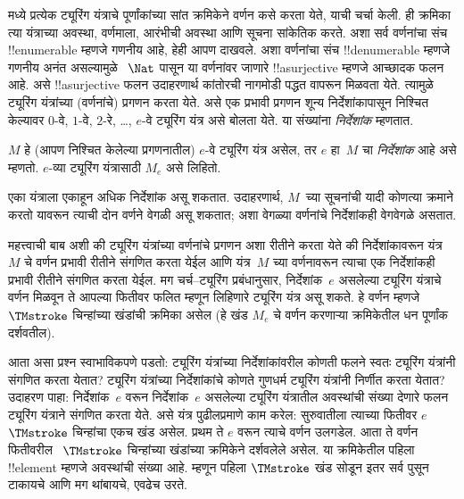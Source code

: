 \documentclass[../../../include/open-logic-section]{subfiles}
\begin{document}

 मध्ये प्रत्येक ट्यूरिंग यंत्राचे
पूर्णांकांच्या सांत क्रमिकेने वर्णन कसे करता येते,
याची चर्चा केली. ही क्रमिका त्या यंत्राच्या अवस्था,
वर्णमाला, आरंभीची अवस्था आणि सूचना सांकेतिक करते.
अशा सर्व वर्णनांचा संच !!{enumerable} म्हणजे गणनीय
आहे, हेही आपण दाखवले. अशा वर्णनांचा संच
!!{denumerable} म्हणजे गणनीय अनंत असल्यामुळे
~$\Nat$ पासून या वर्णनांवर जाणारे
!!a{surjective} म्हणजे आच्छादक फलन आहे.
असे !!a{surjective} फलन उदाहरणार्थ कांतोरची
नागमोडी पद्धत वापरून मिळवता येते. त्यामुळे
ट्यूरिंग यंत्रांच्या (वर्णनांचे) प्रगणन करता येते.
असे एक प्रभावी प्रगणन शून्य निर्देशांकापासून निश्चित केल्यावर $0$-वे, $1$-वे,
$2$-रे, \dots, $e$-वे ट्यूरिंग यंत्र असे
बोलता येते. या संख्यांना \emph{निर्देशांक} म्हणतात.

\begin{defn}
$M$ हे (आपण निश्चित केलेल्या प्रगणनातील)
$e$-वे ट्यूरिंग यंत्र असेल, तर $e$ हा~$M$ चा
\emph{निर्देशांक} आहे असे म्हणतो. $e$-व्या
ट्यूरिंग यंत्रासाठी $M_e$ असे लिहितो.
\end{defn}

एका यंत्राला एकाहून अधिक निर्देशांक असू शकतात.
उदाहरणार्थ, $M$~च्या सूचनांची यादी कोणत्या
क्रमाने करतो यावरून त्याची दोन वर्णने वेगळी
असू शकतात; अशा वेगळ्या वर्णनांचे निर्देशांकही
वेगवेगळे असतात.

महत्त्वाची बाब अशी की ट्यूरिंग यंत्रांच्या वर्णनांचे
प्रगणन अशा रीतीने करता येते की निर्देशांकावरून
यंत्र~$M$ चे वर्णन प्रभावी रीतीने संगणित करता
येईल आणि यंत्र~$M$ च्या वर्णनावरून त्याचा
एक निर्देशांकही प्रभावी रीतीने संगणित करता
येईल. मग चर्च--ट्यूरिंग प्रबंधानुसार, निर्देशांक~$e$
असलेल्या ट्यूरिंग यंत्राचे वर्णन मिळवून ते
आपल्या फितीवर फलित म्हणून लिहिणारे ट्यूरिंग
यंत्र असू शकते. हे वर्णन म्हणजे
~$\TMstroke$ चिन्हांच्या खंडांची क्रमिका असेल
(हे खंड $M_e$ चे वर्णन करणाऱ्या क्रमिकेतील
धन पूर्णांक दर्शवतील).

आता असा प्रश्न स्वाभाविकपणे पडतो: ट्यूरिंग
यंत्रांच्या निर्देशांकांवरील कोणती फलने स्वतः
ट्यूरिंग यंत्रांनी संगणित करता येतात? ट्यूरिंग
यंत्रांच्या निर्देशांकांचे कोणते गुणधर्म ट्यूरिंग
यंत्रांनी निर्णीत करता येतात? उदाहरण पाहा:
निर्देशांक~$e$ वरून निर्देशांक~$e$ असलेल्या
ट्यूरिंग यंत्रातील अवस्थांची संख्या देणारे
फलन ट्यूरिंग यंत्राने संगणित करता येते.
असे यंत्र पुढीलप्रमाणे काम करेल: सुरुवातीला
त्याच्या फितीवर $e$~$\TMstroke$ चिन्हांचा
एकच खंड असेल. प्रथम ते $e$ वरून त्याचे
वर्णन उलगडेल. आता ते वर्णन फितीवरील
~$\TMstroke$ चिन्हांच्या खंडांच्या क्रमिकेने
दर्शवलेले असेल. या क्रमिकेतील पहिला
!!{element} म्हणजे अवस्थांची संख्या आहे.
म्हणून पहिला $\TMstroke$ खंड सोडून इतर
सर्व पुसून टाकायचे आणि मग थांबायचे, एवढेच
उरते.
\end{document}
